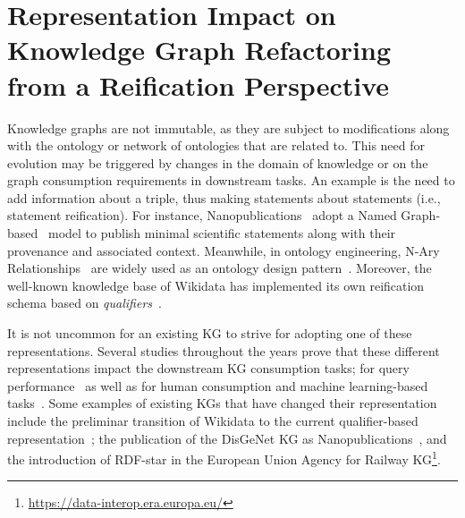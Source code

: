 

\chapter{Representation Impact on Knowledge Graph Refactoring from a Reification Perspective}
\label{chapter:evolution}

Knowledge graphs are not immutable, as they are subject to modifications along with the ontology or network of ontologies that are related to. This need for evolution may be triggered by changes in the domain of knowledge or on the graph consumption requirements in downstream tasks. 
An example is the need to add information about a triple, thus making statements about statements (i.e., statement reification).
For instance, Nanopublications~\parencite{groth2010nanopubs} adopt a Named Graph-based~\parencite{carroll2005namedgraphs} model to publish minimal scientific statements along with their provenance and associated context. Meanwhile, in ontology engineering, N-Ary Relationships~\parencite{naryw3c2006} are widely used as an ontology design pattern~\parencite{gangemi2013multi}. Moreover, the well-known knowledge base of Wikidata has implemented its own reification schema based on \textit{qualifiers}~\parencite{erxleben2014introducing}. 

It is not uncommon for an existing KG to strive for adopting one of these representations. Several studies throughout the years prove that these different representations impact the downstream KG consumption tasks; for query performance~\parencite{das2014tale,nguyen2014don,alocci2015property,hernandez2015reifying,frey2019evaluation,orlandi2021benchmarking} as well as for human consumption and machine learning-based tasks~\parencite{iglesias2023kgconsumption}. Some examples of existing KGs that have changed their representation include the preliminar transition of Wikidata to the current qualifier-based representation~\parencite{erxleben2014introducing}; the publication of the DisGeNet KG as Nanopublications~\parencite{queralt2016disgenet}, and the introduction of RDF-star in the European Union Agency for Railway  KG\footnote{\url{https://data-interop.era.europa.eu/}}.


